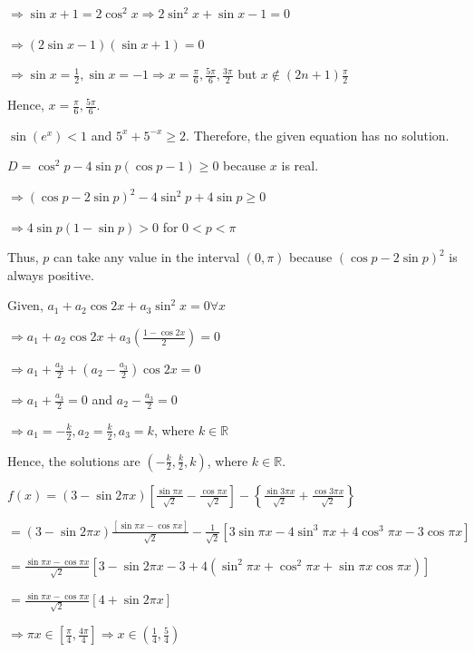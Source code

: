   $\Rightarrow \sin x + 1 = 2\cos^2x\Rightarrow 2\sin^2x + \sin x - 1 = 0$

  $\Rightarrow (2\sin x - 1)(\sin x + 1) = 0$

  $\Rightarrow \sin x = \frac{1}{2}, \sin x = -1 \Rightarrow x
  = \frac{\pi}{6}, \frac{5\pi}{6}, \frac{3\pi}{2}$ but $x\not\in(2n + 1)\frac{\pi}{2}$

  Hence, $x = \frac{\pi}{6}, \frac{5\pi}{6}$.
\item $\sin\left(e^x\right) < 1$ and $5^x + 5^{-x} \ge 2$. Therefore, the given equation has no solution.
\item $D = \cos^2p - 4\sin p(\cos p - 1)\geq 0$ because $x$ is real.

  $\Rightarrow (\cos p - 2\sin p)^2 - 4\sin^2p + 4\sin p\geq 0$

  $\Rightarrow 4\sin p(1 - \sin p)> 0$ for $0 < p < \pi$

  Thus, $p$ can take any value in the interval $(0, \pi)$ because $(\cos p - 2\sin p)^2$ is always positive.
\item Given, $a_1 + a_2\cos2x + a_3\sin^2x = 0\forall x$

  $\Rightarrow a_1 + a_2\cos2x + a_3\left(\frac{1 - \cos2x}{2}\right) = 0$

  $\Rightarrow a_1 + \frac{a_3}{2} + \left(a_2 - \frac{a_3}{2}\right)\cos2x = 0$

  $\Rightarrow a_1 + \frac{a_3}{2} = 0$ and $a_2- \frac{a_3}{2} = 0$

  $\Rightarrow a_1 = -\frac{k}{2}, a_2 = \frac{k}{2}, a_3 = k$, where $k\in\mathbb{R}$

  Hence, the solutions are $\left(-\frac{k}{2}, \frac{k}{2}, k\right)$, where $k\in\mathbb{R}$.
\item $f(x) = (3 - \sin2\pi x)\left[\frac{\sin\pi x}{\sqrt{2}} - \frac{\cos\pi x}{\sqrt{2}}\right]
  - \left\{\frac{\sin3\pi x}{\sqrt{2}} + \frac{\cos3\pi x}{\sqrt{2}}\right\}$

  $= (3 - \sin2\pi x)\frac{\left[\sin\pi x - \cos\pi x\right]}{\sqrt{2}} - \frac{1}{\sqrt{2}}[3\sin\pi x -
    4\sin^3\pi x + 4\cos^3\pi x - 3\cos\pi x]$

  $= \frac{\sin\pi x - \cos\pi x}{\sqrt{2}}[3 - \sin2\pi x - 3+ 4\left(\sin^2\pi x + \cos^2\pi x + \sin\pi
    x\cos\pi x\right)]$

  $= \frac{\sin\pi x - \cos\pi x}{\sqrt{2}}[4 + \sin2\pi x]$

  $\Rightarrow \pi x\in\left[\frac{\pi}{4}, \frac{4\pi}{4}\right]\Rightarrow
  x\in\left(\frac{1}{4}, \frac{5}{4}\right)$

